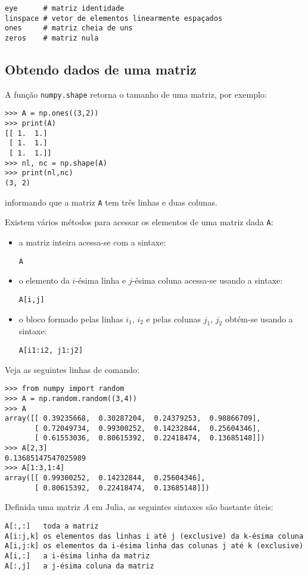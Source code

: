 \begin{lstlisting}
eye      # matriz identidade
linspace # vetor de elementos linearmente espaçados
ones     # matriz cheia de uns
zeros    # matriz nula
\end{lstlisting}

\subsection{Obtendo dados de uma matriz}

A função \verb+numpy.shape+ retorna o tamanho de uma matriz, por exemplo:
\begin{lstlisting}
>>> A = np.ones((3,2))
>>> print(A)
[[ 1.  1.]
 [ 1.  1.]
 [ 1.  1.]]
>>> nl, nc = np.shape(A)
>>> print(nl,nc)
(3, 2)
\end{lstlisting}
informando que a matriz \verb+A+ tem três linhas e duas colunas.

Existem vários métodos para acessar os elementos de uma matriz dada \verb+A+:
\begin{itemize}
\item a matriz inteira acessa-se com a sintaxe:
\begin{lstlisting}
A
\end{lstlisting}
\item o elemento da $i$-ésima linha e $j$-ésima coluna acessa-se usando a sintaxe:
\begin{lstlisting}
A[i,j]
\end{lstlisting}
\item o bloco formado pelas linhas $i_1$, $i_2$ e pelas colunas $j_1$, $j_2$ obtém-se usando a sintaxe:
\begin{lstlisting}
A[i1:i2, j1:j2]
\end{lstlisting}
\end{itemize}

\begin{ex}
  Veja as seguintes linhas de comando:
\begin{lstlisting}
>>> from numpy import random
>>> A = np.random.random((3,4))
>>> A
array([[ 0.39235668,  0.30287204,  0.24379253,  0.98866709],
       [ 0.72049734,  0.99300252,  0.14232844,  0.25604346],
       [ 0.61553036,  0.80615392,  0.22418474,  0.13685148]])
>>> A[2,3]
0.13685147547025989
>>> A[1:3,1:4]
array([[ 0.99300252,  0.14232844,  0.25604346],
       [ 0.80615392,  0.22418474,  0.13685148]])
\end{lstlisting}
\end{ex}

Definida uma matriz $A$ em Julia, as seguintes sintaxes são bastante úteis:
\begin{lstlisting}
A[:,:]   toda a matriz
A[i:j,k] os elementos das linhas i até j (exclusive) da k-ésima coluna
A[i,j:k] os elementos da i-ésima linha das colunas j até k (exclusive)
A[i,:]   a i-ésima linha da matriz
A[:,j]   a j-ésima coluna da matriz
\end{lstlisting}

